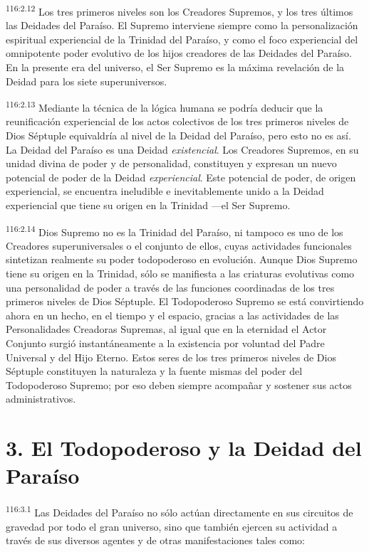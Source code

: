 \par
\textsuperscript{116:2.12} Los tres primeros niveles son los Creadores Supremos, y los tres últimos las Deidades del Paraíso. El Supremo interviene siempre como la personalización espiritual experiencial de la Trinidad del Paraíso, y como el foco experiencial del omnipotente poder evolutivo de los hijos creadores de las Deidades del Paraíso. En la presente era del universo, el Ser Supremo es la máxima revelación de la Deidad para los siete superuniversos.

\par
\textsuperscript{116:2.13} Mediante la técnica de la lógica humana se podría deducir que la reunificación experiencial de los actos colectivos de los tres primeros niveles de Dios Séptuple equivaldría al nivel de la Deidad del Paraíso, pero esto no es así. La Deidad del Paraíso es una Deidad \textit{existencial}. Los Creadores Supremos, en su unidad divina de poder y de personalidad, constituyen y expresan un nuevo potencial de poder de la Deidad \textit{experiencial}. Este potencial de poder, de origen experiencial, se encuentra ineludible e inevitablemente unido a la Deidad experiencial que tiene su origen en la Trinidad ---el Ser Supremo.

\par
\textsuperscript{116:2.14} Dios Supremo no es la Trinidad del Paraíso, ni tampoco es uno de los Creadores superuniversales o el conjunto de ellos, cuyas actividades funcionales sintetizan realmente su poder todopoderoso en evolución. Aunque Dios Supremo tiene su origen en la Trinidad, sólo se manifiesta a las criaturas evolutivas como una personalidad de poder a través de las funciones coordinadas de los tres primeros niveles de Dios Séptuple. El Todopoderoso Supremo se está convirtiendo ahora en un hecho, en el tiempo y el espacio, gracias a las actividades de las Personalidades Creadoras Supremas, al igual que en la eternidad el Actor Conjunto surgió instantáneamente a la existencia por voluntad del Padre Universal y del Hijo Eterno. Estos seres de los tres primeros niveles de Dios Séptuple constituyen la naturaleza y la fuente mismas del poder del Todopoderoso Supremo; por eso deben siempre acompañar y sostener sus actos administrativos.

\section*{3. El Todopoderoso y la Deidad del Paraíso}
\par
\textsuperscript{116:3.1} Las Deidades del Paraíso no sólo actúan directamente en sus circuitos de gravedad por todo el gran universo, sino que también ejercen su actividad a través de sus diversos agentes y de otras manifestaciones tales como:

